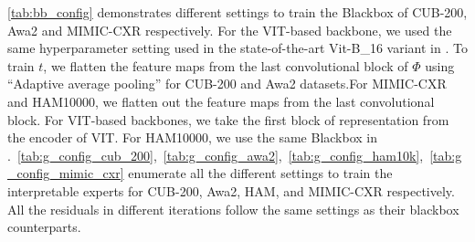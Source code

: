 


\cref{tab:bb_config} demonstrates different settings to train the Blackbox of CUB-200, Awa2 and MIMIC-CXR respectively. For the VIT-based backbone, we used the same hyperparameter setting used in the state-of-the-art Vit-B\_16 variant in \cite{wang2021feature}. To train $t$, we flatten the feature maps from the last convolutional block of $\Phi$ using ``Adaptive average pooling'' for CUB-200 and Awa2 datasets.For MIMIC-CXR and HAM10000, we flatten out the feature maps from the last convolutional block. For VIT-based backbones, we take the first block of representation from the encoder of VIT.  For HAM10000, we use the same Blackbox in \cite{yuksekgonul2022post}.~\cref{tab:g_config_cub_200},~\cref{tab:g_config_awa2},~\cref{tab:g_config_ham10k},~\cref{tab:g_config_mimic_cxr} enumerate all the different settings to train the interpretable experts for CUB-200, Awa2, HAM, and MIMIC-CXR respectively. All the residuals in different iterations follow the same settings as their blackbox counterparts.




